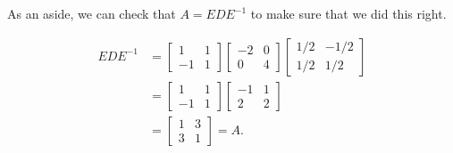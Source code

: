 \documentclass{ximera}
\begin{document}
\begin{exampleSol}
As an aside, we can check that $A = EDE^{-1}$ to make sure that we did this right.

\begin{equation*}
\begin{split}
    EDE^{-1} &= \begin{bmatrix} 1 & 1 \\ -1 & 1 \end{bmatrix} \begin{bmatrix} -2 & 0 \\ 0 & 4 \end{bmatrix} \begin{bmatrix} 1/2 & -1/2 \\ 1/2 & 1/2 \end{bmatrix} \\
    &= \begin{bmatrix} 1 & 1 \\ -1 & 1 \end{bmatrix} \begin{bmatrix} -1 & 1 \\ 2 & 2 \end{bmatrix} \\
    &= \begin{bmatrix} 1 & 3 \\ 3 & 1 \end{bmatrix} = A.
\end{split}
\end{equation*}


\end{exampleSol}
\end{document}
